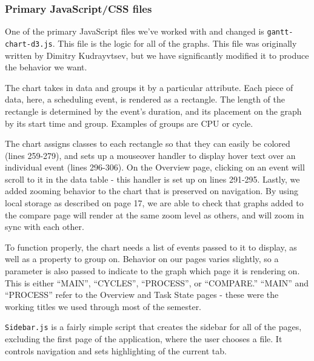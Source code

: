 \documentclass{hmcclinic}
\begin{document}
  \subsubsection{Primary JavaScript/CSS files}
  One of the primary JavaScript files we've worked
  with and changed is \texttt{gantt-chart-d3.js}. This file is the logic for all of the
  graphs. This file was originally written by Dimitry Kudrayvtsev, but we have
  significantly modified it to produce the behavior we want.

  The chart takes in data and groups it by a particular attribute. Each piece
  of data, here, a scheduling event, is rendered as a rectangle. The
  length of the rectangle is determined by the event's duration, and its
  placement on the graph by its start time and group. Examples of groups are
  CPU or cycle.

  The chart assigns classes to each rectangle so that they can easily be
  colored (lines 259-279), and sets up a mouseover handler to display hover text
  over an individual event (lines 296-306). On the Overview page, clicking
  on an event will scroll to it in the data table - this handler is set up on
  lines 291-295. Lastly, we added zooming behavior to the chart that is
  preserved on navigation. By using local storage as described on page 17, we
  are able to check that graphs added to the compare page will render at the
  same zoom level as others, and will zoom in sync with each other.

  To function properly, the chart needs a list of events passed to it to
  display, as well as a property to group on. Behavior on our pages varies
  slightly, so a parameter is also passed to indicate to the graph which
  page it is rendering on. This is either ``MAIN'', ``CYCLES'', ``PROCESS'',
  or ``COMPARE.'' ``MAIN'' and ``PROCESS'' refer to the Overview and Task
  State pages - these were the working titles we used through most of the
  semester.

  \texttt{Sidebar.js} is a fairly simple script that creates the sidebar for all of the
  pages, excluding the first page of the application, where the user chooses a file.
  It controls navigation and sets highlighting of the current tab.
\end{document}
